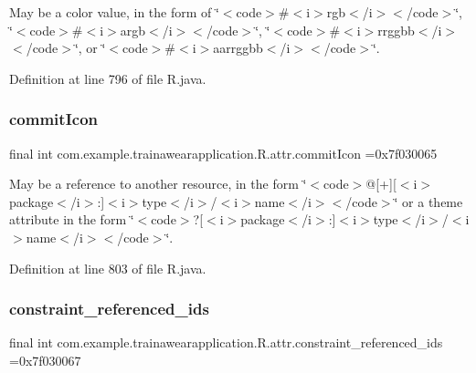 May be a color value, in the form of \char`\"{}$<$code$>$\#$<$i$>$rgb$<$/i$>$$<$/code$>$\char`\"{}, \char`\"{}$<$code$>$\#$<$i$>$argb$<$/i$>$$<$/code$>$\char`\"{}, \char`\"{}$<$code$>$\#$<$i$>$rrggbb$<$/i$>$$<$/code$>$\char`\"{}, or \char`\"{}$<$code$>$\#$<$i$>$aarrggbb$<$/i$>$$<$/code$>$\char`\"{}. 

Definition at line 796 of file R.\+java.

\mbox{\label{classcom_1_1example_1_1trainawearapplication_1_1_r_1_1attr_a0fbe386f8202a96e1f4703d3fc825361}} 
\subsubsection{\texorpdfstring{commitIcon}{commitIcon}}
{\footnotesize\ttfamily final int com.\+example.\+trainawearapplication.\+R.\+attr.\+commit\+Icon =0x7f030065\hspace{0.3cm}{\ttfamily [static]}}

May be a reference to another resource, in the form \char`\"{}$<$code$>$@\mbox{[}+\mbox{]}\mbox{[}$<$i$>$package$<$/i$>$\+:\mbox{]}$<$i$>$type$<$/i$>$/$<$i$>$name$<$/i$>$$<$/code$>$\char`\"{} or a theme attribute in the form \char`\"{}$<$code$>$?\mbox{[}$<$i$>$package$<$/i$>$\+:\mbox{]}$<$i$>$type$<$/i$>$/$<$i$>$name$<$/i$>$$<$/code$>$\char`\"{}. 

Definition at line 803 of file R.\+java.

\mbox{\label{classcom_1_1example_1_1trainawearapplication_1_1_r_1_1attr_a5600edd641561c1abbba03843a211875}} 
\subsubsection{\texorpdfstring{constraint\_referenced\_ids}{constraint\_referenced\_ids}}
{\footnotesize\ttfamily final int com.\+example.\+trainawearapplication.\+R.\+attr.\+constraint\+\_\+referenced\+\_\+ids =0x7f030067\hspace{0.3cm}{\ttfamily [static]}}

